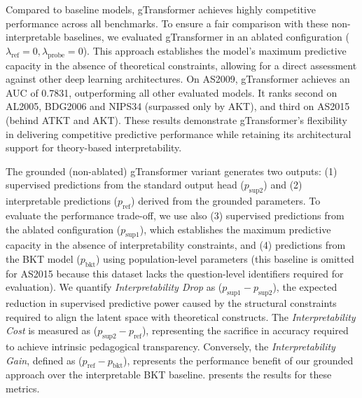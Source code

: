 \documentclass[applsci,article,submit,moreauthors,pdftex]{Definitions/mdpi}
\begin{document}
Compared to baseline models, gTransformer achieves highly competitive performance across all benchmarks. To ensure a fair comparison with these non-interpretable baselines, we evaluated gTransformer in an ablated configuration ($\lambda_{\text{ref}} = 0, \lambda_{\text{probe}} = 0$). This approach establishes the model's maximum predictive capacity in the absence of theoretical constraints, allowing for a direct assessment against other deep learning architectures. On AS2009, gTransformer achieves an AUC of 0.7831, outperforming all other evaluated models. It ranks second on AL2005, BDG2006 and NIPS34 (surpassed only by AKT), and third on AS2015 (behind ATKT and AKT). These results demonstrate gTransformer's flexibility in delivering competitive predictive performance while retaining its architectural support for theory-based interpretability. 

The grounded (non-ablated) gTransformer variant generates two outputs: (1) supervised predictions from the standard output head ($p_{\text{sup}2}$) and (2) interpretable predictions ($p_{\text{ref}}$) derived from the grounded parameters. To evaluate the performance trade-off, we use also (3) supervised predictions from the ablated configuration ($p_{\text{sup}1}$), which establishes the maximum predictive capacity in the absence of interpretability constraints, and (4) predictions from the BKT model ($p_{\text{bkt}}$) using population-level parameters (this baseline is omitted for AS2015 because this dataset lacks the question-level identifiers required for evaluation). We quantify \textit{Interpretability Drop} as ($p_{\text{sup}1} - p_{\text{sup}2}$), the expected reduction in supervised predictive power caused by the structural constraints required to align the latent space with theoretical constructs. The \textit{Interpretability Cost} is measured as ($p_{\text{sup}2} - p_{\text{ref}}$), representing the sacrifice in accuracy required to achieve intrinsic pedagogical transparency. Conversely, the \textit{Interpretability Gain}, defined as ($p_{\text{ref}} - p_{\text{bkt}}$), represents the performance benefit of our grounded approach over the interpretable BKT baseline.  presents the results for these metrics. 
\end{document}
